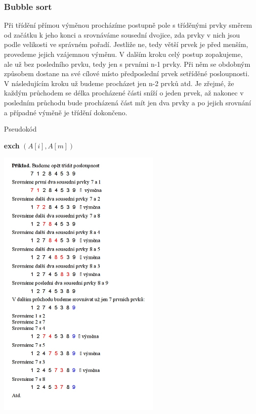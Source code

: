 \documentclass[10pt,a4paper]{article}
\begin{document}
\subsubsection{Bubble sort}
Při třídění přímou výměnou procházíme postupně pole s tříděnými prvky směrem od začátku k jeho konci a srovnáváme sousední dvojice, zda prvky v nich jsou podle velikosti ve správném pořadí. Jestliže ne, tedy větší prvek je před menším, provedeme jejich vzájemnou výměnu. V dalším kroku celý postup zopakujeme, ale už bez posledního prvku, tedy jen s prvními n-1 prvky. Při něm se obdobným způsobem dostane na své cílové místo předposlední prvek setříděné posloupnosti. V následujícím kroku už budeme procházet jen n-2 prvků atd. Je zřejmé, že každým průchodem se délka procházené části sníží o jeden prvek, až nakonec v posledním průchodu bude procházená část mít jen dva prvky a po jejich srovnání a případné výměně je třídění dokončeno. \\
\begin{algorithm}
\caption{Pseudokód}
\begin{algorithmic}[]
			\State 	\textbf{exch} $(A[i], A[m])$
		\EndIf
	\EndFor
\EndFor
\EndProcedure
\end{algorithmic}
\end{algorithm}
\newpage
\includegraphics[width=8cm]{img/bubble}
\end{document}

